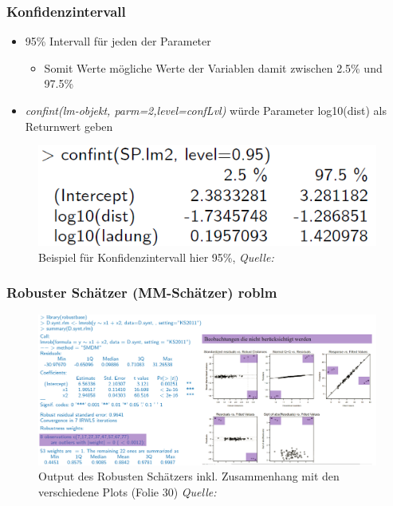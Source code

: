 \subsubsection{Konfidenzintervall}
\label{subsubsec:konfidenzintervallR}
\begin{itemize}
	\item 95\% Intervall für jeden der Parameter
	\begin{itemize}
		\item Somit Werte mögliche Werte der Variablen damit zwischen 2.5\% und 97.5\% 
	\end{itemize}
	\item \textit{confint(lm-objekt, parm=2,level=confLvl)} würde Parameter log10(dist) als Returnwert geben
\end{itemize}
\begin{figure}[!h]
	\includegraphics[width=0.3\linewidth]{figures/confint}
	\caption{Beispiel für Konfidenzintervall hier 95\%, \textit{Quelle:} \cite{C:confint}}
	\label{fig:confint}
\end{figure}

\subsubsection{Robuster Schätzer (MM-Schätzer) roblm}
\label{subsubsec:RobSchaetzer}
\begin{figure}[!h]
	\centering
	\includegraphics[width=1\linewidth]{figures/roblm}
	\caption{Output des Robusten Schätzers inkl. Zusammenhang mit den verschiedene Plots (Folie 30) \textit{Quelle:}\cite{C:Roblm}}
	\label{fig:roblm}
\end{figure}

\clearpage
